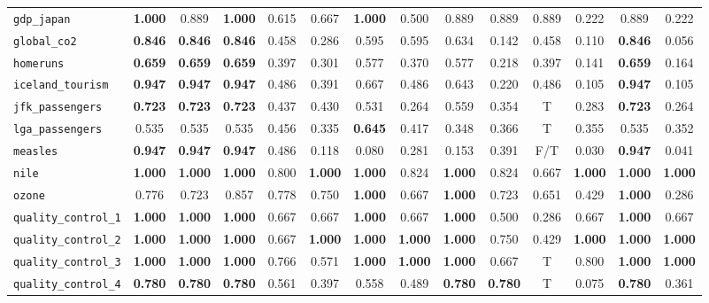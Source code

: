 \begin{tabular}{lccccccccccccc}
\verb+gdp_japan+ & \textbf{1.000} & 0.889 & \textbf{1.000} & 0.615 & 0.667 & \textbf{1.000} & 0.500 & 0.889 & 0.889 & 0.889 & 0.222 & 0.889 & 0.222\\
\verb+global_co2+ & \textbf{0.846} & \textbf{0.846} & \textbf{0.846} & 0.458 & 0.286 & 0.595 & 0.595 & 0.634 & 0.142 & 0.458 & 0.110 & \textbf{0.846} & 0.056\\
\verb+homeruns+ & \textbf{0.659} & \textbf{0.659} & \textbf{0.659} & 0.397 & 0.301 & 0.577 & 0.370 & 0.577 & 0.218 & 0.397 & 0.141 & \textbf{0.659} & 0.164\\
\verb+iceland_tourism+ & \textbf{0.947} & \textbf{0.947} & \textbf{0.947} & 0.486 & 0.391 & 0.667 & 0.486 & 0.643 & 0.220 & 0.486 & 0.105 & \textbf{0.947} & 0.105\\
\verb+jfk_passengers+ & \textbf{0.723} & \textbf{0.723} & \textbf{0.723} & 0.437 & 0.430 & 0.531 & 0.264 & 0.559 & 0.354 & T & 0.283 & \textbf{0.723} & 0.264\\
\verb+lga_passengers+ & 0.535 & 0.535 & 0.535 & 0.456 & 0.335 & \textbf{0.645} & 0.417 & 0.348 & 0.366 & T & 0.355 & 0.535 & 0.352\\
\verb+measles+ & \textbf{0.947} & \textbf{0.947} & \textbf{0.947} & 0.486 & 0.118 & 0.080 & 0.281 & 0.153 & 0.391 & F/T & 0.030 & \textbf{0.947} & 0.041\\
\verb+nile+ & \textbf{1.000} & \textbf{1.000} & \textbf{1.000} & 0.800 & \textbf{1.000} & \textbf{1.000} & 0.824 & \textbf{1.000} & 0.824 & 0.667 & \textbf{1.000} & \textbf{1.000} & \textbf{1.000}\\
\verb+ozone+ & 0.776 & 0.723 & 0.857 & 0.778 & 0.750 & \textbf{1.000} & 0.667 & \textbf{1.000} & 0.723 & 0.651 & 0.429 & \textbf{1.000} & 0.286\\
\verb+quality_control_1+ & \textbf{1.000} & \textbf{1.000} & \textbf{1.000} & 0.667 & 0.667 & \textbf{1.000} & 0.667 & \textbf{1.000} & 0.500 & 0.286 & 0.667 & \textbf{1.000} & 0.667\\
\verb+quality_control_2+ & \textbf{1.000} & \textbf{1.000} & \textbf{1.000} & 0.667 & \textbf{1.000} & \textbf{1.000} & \textbf{1.000} & \textbf{1.000} & 0.750 & 0.429 & \textbf{1.000} & \textbf{1.000} & \textbf{1.000}\\
\verb+quality_control_3+ & \textbf{1.000} & \textbf{1.000} & \textbf{1.000} & 0.766 & 0.571 & \textbf{1.000} & \textbf{1.000} & \textbf{1.000} & 0.667 & T & 0.800 & \textbf{1.000} & \textbf{1.000}\\
\verb+quality_control_4+ & \textbf{0.780} & \textbf{0.780} & \textbf{0.780} & 0.561 & 0.397 & 0.558 & 0.489 & \textbf{0.780} & \textbf{0.780} & T & 0.075 & \textbf{0.780} & 0.361\\

\end{tabular}

